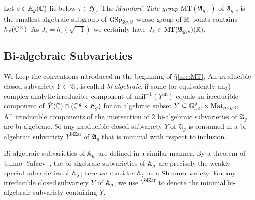 \documentclass[12pt,oneside]{amsart}
\begin{document}
Let $s\in{\mathbb{A}}_g({\mathbb{C}})$ lie below $\tau\in\mathfrak{H}_g$. 
The \emph{Mumford--Tate group} $\mathrm{MT}(\mathfrak{A}_{g,s})$ of  $\mathfrak{A}_{g,s}$ is the
smallest algebraic subgroup of $\mathrm{GSp}_{2g,{\mathbb{Q}}}$
whose group of  ${\mathbb{R}}$-points contains $h_\tau({\mathbb{C}}^\times)$. 
As $J_\tau = h_\tau(\sqrt{-1})$ we certainly have
$J_\tau\in \mathrm{MT}(\mathfrak{A}_{g,s})({\mathbb{R}})$. 



\subsection{Bi-algebraic Subvarieties}
\label{sec:bialgebraic}


We keep the conventions introduced in the beginning of
$\mathsection$\ref{sec:MT}. 
An irreducible closed subvariety $Y\subset\mathfrak{A}_g$ is called
\emph{bi-algebraic}, if some (or equivalently any) complex analytic irreducible component
of $\mathrm{unif}^{-1}(Y^{\mathrm{an}})$ equals an irreducible
component of $\tilde Y({\mathbb{C}})\cap
({\mathbb{C}}^g\times \mathfrak{H}_g)$ for an algebraic subset
$\tilde Y\subseteq {\mathbb{G}}_{\mathrm{a},{\mathbb{C}}}^g\times \mathrm{Mat}_{g\times
  g,{\mathbb{C}}}$.
All irreducible components of the intersection of $2$ bi-algebraic subvarieties of $\mathfrak{A}_g$
are bi-algebraic. So any
 irreducible closed subvariety $Y$ of $\mathfrak{A}_g$ is contained
in a bi-algebraic subvariety $Y^{\mathrm{biZar}}$ of
$\mathfrak{A}_g$ that is minimal with respect to inclusion.

Bi-algebraic subvarieties of ${\mathbb{A}}_g$ are defined in a similar manner.
By a theorem of Ullmo--Yafaev~\cite[Theorem 1.2]{UYweaklyspecial}, the bi-algebraic subvarieties
of ${\mathbb{A}}_g$ are precisely the weakly special subvarieties of ${\mathbb{A}}_g$;
here we consider
${\mathbb{A}}_g$ as a Shimura variety. 
For any irreducible closed subvariety $Y$ of ${\mathbb{A}}_g$, we use 
$Y^{\mathrm{biZar}}$ to denote the minimal bi-algebraic subvariety
containing $Y$. 
\end{document}
